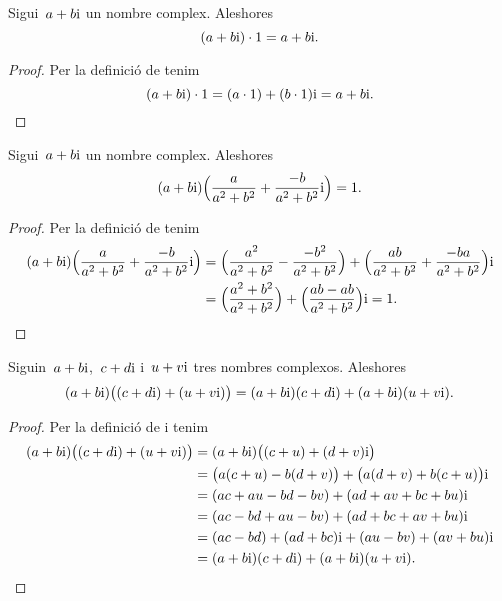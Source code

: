 \documentclass[../../main.tex]{subfiles}
\begin{document}
    \begin{proposition}
        \label{prop:element neutre pel producte dels complexos}
        Sigui~\(a+b\mathrm{i}\) un nombre complex.
        Aleshores
        \[
            (a+b\mathrm{i})\cdot1 = a+b\mathrm{i}.
        \]
        \begin{proof}
            Per la definició de  tenim
            \[
                (a+b\mathrm{i})\cdot1 = (a\cdot1)+(b\cdot1)\mathrm{i} = a+b\mathrm{i}.\qedhere
            \]
        \end{proof}
    \end{proposition}
    \begin{proposition}
        \label{prop:element invers pel producte de nombres complexos}
        Sigui~\(a+b\mathrm{i}\) un nombre complex.
        Aleshores
        \[
            (a+b\mathrm{i})\Big(\frac{a}{a^{2}+b^{2}} + \frac{-b}{a^{2}+b^{2}}\mathrm{i}\Big)
            = 1.
        \]
        \begin{proof}
            Per la definició de  tenim
            \begin{align*}
                (a+b\mathrm{i})\Big(\frac{a}{a^{2}+b^{2}}+\frac{-b}{a^{2}+b^{2}}\mathrm{i}\Big)
                    &= \Big(\frac{a^{2}}{a^{2}+b^{2}}-\frac{-b^{2}}{a^{2}+b^{2}}\Big)
                       +\Big(\frac{ab}{a^{2}+b^{2}}+\frac{-ba}{a^{2}+b^{2}}\Big)\mathrm{i} \\
                    &= \Big(\frac{a^{2}+b^{2}}{a^{2}+b^{2}}\Big)
                       +\Big(\frac{ab-ab}{a^{2}+b^{2}}\Big)\mathrm{i} = 1.\qedhere
            \end{align*}
        \end{proof}
    \end{proposition}
    \begin{proposition}
        \label{prop:distribuitva del producte respecte la suma de nombres complexos}
        Siguin~\(a+b\mathrm{i}\),~\(c+d\mathrm{i}\) i~\(u+v\mathrm{i}\) tres nombres complexos.
        Aleshores
        \[
            (a+b\mathrm{i})\big((c+d\mathrm{i})+(u+v\mathrm{i})\big) = (a+b\mathrm{i})(c+d\mathrm{i})+(a+b\mathrm{i})(u+v\mathrm{i}).
        \]
        \begin{proof}
            Per la definició de 
            i  tenim
            \begin{align*}
                (a+b\mathrm{i})\big((c+d\mathrm{i})+(u+v\mathrm{i})\big)
                    &= (a+b\mathrm{i})\big((c+u)+(d+v)\mathrm{i}\big) \\
                    &= \big(a(c+u)-b(d+v)\big)+\big(a(d+v)+b(c+u)\big)\mathrm{i} \\
                    &= (ac+au-bd-bv)+(ad+av+bc+bu)\mathrm{i} \\
                    &= (ac-bd+au-bv)+(ad+bc+av+bu)\mathrm{i}\\
                    &= (ac-bd)+(ad+bc)\mathrm{i}+(au-bv)+(av+bu)\mathrm{i} \\
                    &= (a+b\mathrm{i})(c+d\mathrm{i})+(a+b\mathrm{i})(u+v\mathrm{i}).\qedhere
            \end{align*}
        \end{proof}
    \end{proposition}
\end{document}
